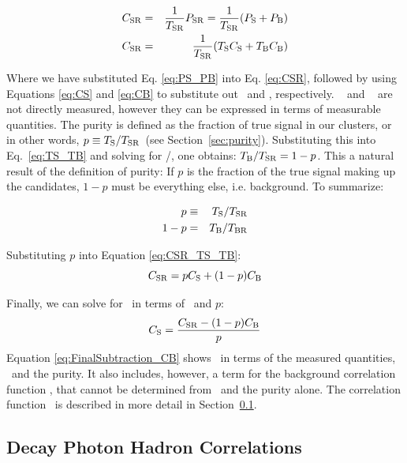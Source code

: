 \begin{eqnarray}
  \label{eq:31}
  C_{\mathrm{SR}} &=& \frac{1}{T_{\mathrm{SR}}}P_{\mathrm{SR}} = \frac{1}{T_{\mathrm{SR}}}(P_{\mathrm{S}} + P_{\mathrm{B}})\\
  C_{\mathrm{SR}} &=& \frac{1}{T_{\mathrm{SR}}}(T_{\mathrm{S}}C_{\mathrm{S}} +T_{\mathrm{B}}C_{\mathrm{B}})\label{eq:CSR_TS_TB}
\end{eqnarray}

Where we have substituted Eq. \ref{eq:PS_PB} into  Eq. \ref{eq:CSR}, followed by using Equations \ref{eq:CS} and \ref{eq:CB} to substitute out \PS~and \PB, respectively. \TS~ and \TB~ are not directly measured, however they can be expressed in terms of measurable quantities. The purity is defined as the fraction of true signal in our \gammaiso clusters, or in other words, $p \equiv T_{\mathrm{S}}/T_{\mathrm{SR}}$~(see Section~\ref{sec:purity}). Substituting this into Eq.~\ref{eq:TS_TB} and solving for \TB/\TSR, one obtains: $T_{\mathrm{B}}/T_{\mathrm{SR}} = 1-p$. This a natural result of the definition of purity: If $p$ is the fraction of the true signal making up the \gammaiso candidates, $1-p$ must be everything else, i.e. background. To summarize:

\begin{eqnarray}
  p &\equiv & T_{\mathrm{S}}/T_{\mathrm{SR}}\\
  1-p &=& T_{\mathrm{B}}/T_{\mathrm{BR}}
\end{eqnarray}


Substituting $p$ into Equation \ref{eq:CSR_TS_TB}:
\begin{equation}
  C_{\mathrm{SR}} = pC_{\mathrm{S}}+ (1-p)C_{\mathrm{B}} \label{eq:CSR_CS}
\end{equation}

Finally, we can solve for \CS~in terms of \CSR~and $p$:
\begin{equation}
  C_{\mathrm{S}} = \frac{C_{\mathrm{SR}} - (1-p) C_{\mathrm{B}}}{p}
  \label{eq:FinalSubtraction_CB}
\end{equation}
Equation \ref{eq:FinalSubtraction_CB} shows \CS~in terms of the measured quantities, \CSR~and the purity. It also includes, however, a term for the background correlation function \CB, that cannot be determined from \CSR~and the purity alone. The correlation function \CB~is described in more detail in Section~\ref{sec:cb}.

\subsection{Decay Photon Hadron Correlations}
\label{sec:cb}


